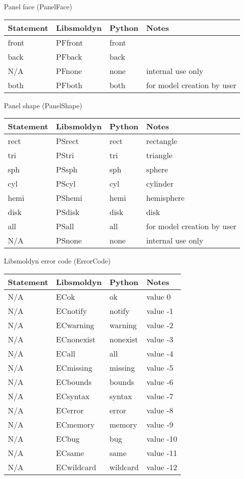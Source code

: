 \documentclass {scrbook}
\begin{document}
Panel face (PanelFace)
\begin{longtable}[c]{llll}
Statement & Libsmoldyn & Python & Notes\\
\hline
front & PFfront & front\\
back & PFback & back\\
N/A & PFnone & none & internal use only\\
both & PFboth & both & for model creation by user
\end{longtable}

Panel shape (PanelShape)
\begin{longtable}[c]{llll}
Statement & Libsmoldyn & Python & Notes\\
\hline
rect & PSrect & rect & rectangle\\
tri & PStri & tri & triangle\\
sph & PSsph & sph & sphere\\
cyl & PScyl & cyl & cylinder\\
hemi & PShemi & hemi & hemisphere\\
disk & PSdisk & disk & disk\\
all & PSall & all & for model creation by user\\
N/A & PSnone & none & internal use only
\end{longtable}

Libsmoldyn error code (ErrorCode)
\begin{longtable}[c]{llll}
Statement & Libsmoldyn & Python & Notes\\
\hline
N/A & ECok & ok & value 0\\
N/A & ECnotify & notify & value -1\\
N/A & ECwarning & warning & value -2\\
N/A & ECnonexist & nonexist & value -3\\
N/A & ECall & all & value -4\\
N/A & ECmissing & missing & value -5\\
N/A & ECbounds & bounds & value -6\\
N/A & ECsyntax & syntax & value -7\\
N/A & ECerror & error & value -8\\
N/A & ECmemory & memory & value -9\\
N/A & ECbug & bug & value -10\\
N/A & ECsame & same & value -11\\
N/A & ECwildcard & wildcard & value -12
\end{longtable}
\end{document}

